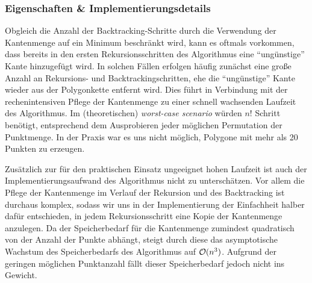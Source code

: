   \subsubsection{Eigenschaften \& Implementierungsdetails}
  
    Obgleich die Anzahl der Backtracking-Schritte durch die Verwendung der
    Kantenmenge auf ein Minimum beschränkt wird, kann es oftmals vorkommen,
    dass bereits in den ersten Rekursionsschritten des Algorithmus eine
    \enquote{ungünstige} Kante hinzugefügt wird. In solchen Fällen erfolgen
    häufig zunächst eine große Anzahl an Rekursions- und
    Backtrackingschritten, ehe die \enquote{ungünstige} Kante wieder aus der
    Polygonkette entfernt wird. Dies führt in Verbindung mit der
    rechenintensiven Pflege der Kantenmenge zu einer schnell wachsenden
    Laufzeit des Algorithmus. Im (theoretischen) \emph{worst-case scenario}
    würden $n!$ Schritt benötigt, entsprechend dem Ausprobieren jeder
    möglichen Permutation der Punktmenge. In der Praxis war es uns nicht
    möglich, Polygone mit mehr als 20 Punkten zu erzeugen.

    Zusätzlich zur für den praktischen Einsatz ungeeignet hohen Laufzeit ist
    auch der Implementierungsaufwand des Algorithmus nicht zu unterschätzen.
    Vor allem die Pflege der Kantenmenge im Verlauf der Rekursion und des
    Backtracking ist durchaus komplex, sodass wir uns in der Implementierung
    der Einfachheit halber dafür entschieden, in jedem Rekursionsschritt eine
    Kopie der Kantenmenge anzulegen. Da der Speicherbedarf für die Kantenmenge
    zumindest quadratisch von der Anzahl der Punkte abhängt, steigt durch
    diese das asymptotische Wachstum des Speicherbedarfs des Algorithmus auf
    $\mathcal{O}(n^3)$. Aufgrund der geringen möglichen Punktanzahl fällt dieser
    Speicherbedarf jedoch nicht ins Gewicht.
